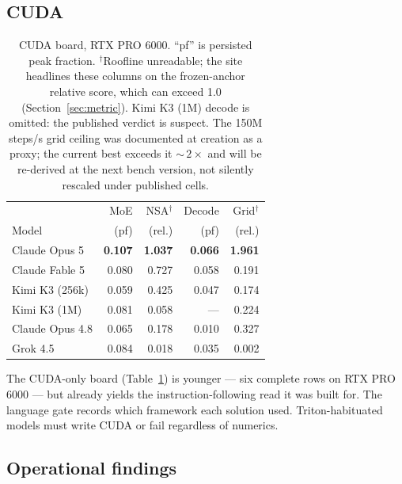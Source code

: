 \documentclass[11pt]{article}
\begin{document}
\subsection{CUDA}

\begin{table}[t]
\centering
\small
\begin{tabular}{@{}lrrrr@{}}
\toprule
 & MoE & NSA$^{\dagger}$ & Decode & Grid$^{\dagger}$ \\
Model & (pf) & (rel.) & (pf) & (rel.) \\
\midrule
Claude Opus 5 & \textbf{0.107} & \textbf{1.037} & \textbf{0.066} & \textbf{1.961} \\
Claude Fable 5 & 0.080 & 0.727 & 0.058 & 0.191 \\
Kimi K3 (256k) & 0.059 & 0.425 & 0.047 & 0.174 \\
Kimi K3 (1M) & 0.081 & 0.058 & --- & 0.224 \\
Claude Opus 4.8 & 0.065 & 0.178 & 0.010 & 0.327 \\
Grok 4.5 & 0.084 & 0.018 & 0.035 & 0.002 \\
\bottomrule
\end{tabular}
\caption{CUDA board, RTX PRO 6000. ``pf'' is persisted peak fraction. $^{\dagger}$Roofline unreadable; the site headlines these columns on the frozen-anchor relative score, which can exceed 1.0 (Section~\ref{sec:metric}). Kimi K3 (1M) decode is omitted: the published verdict is suspect. The 150M steps/s grid ceiling was documented at creation as a proxy; the current best exceeds it ${\sim}\,2\times$ and will be re-derived at the next bench version, not silently rescaled under published cells.}
\label{tab:cuda}
\end{table}

The CUDA-only board (Table~\ref{tab:cuda}) is younger --- six complete rows on RTX PRO 6000 --- but already yields the instruction-following read it was built for. The language gate records which framework each solution used. Triton-habituated models must write CUDA or fail regardless of numerics.

\subsection{Operational findings}
\end{document}
